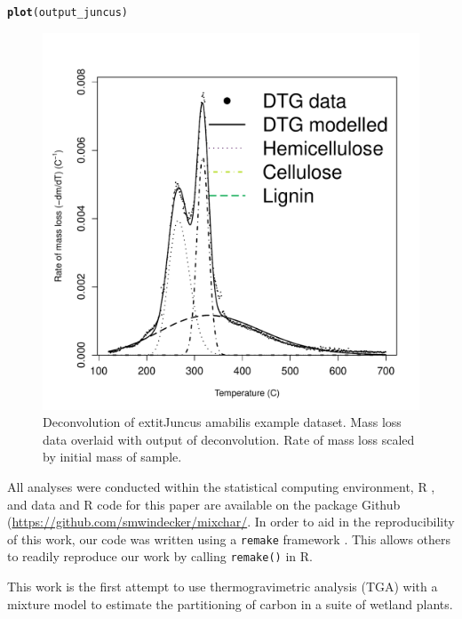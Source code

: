 \documentclass{jors}\usepackage[]{graphicx}\usepackage[]{color}
\makeatletter
\def\maxwidth{ %
  \ifdim\Gin@nat@width>\linewidth
    \linewidth
  \else
    \Gin@nat@width
  \fi
}
\newcommand{\hlstd}[1]{\textcolor[rgb]{0.345,0.345,0.345}{#1}}%
\newcommand{\hlkwd}[1]{\textcolor[rgb]{0.737,0.353,0.396}{\textbf{#1}}}%
\newenvironment{kframe}{%
 \def\at@end@of@kframe{}%
 \ifinner\ifhmode%
  \def\at@end@of@kframe{\end{minipage}}%
  \begin{minipage}{\columnwidth}%
 \fi\fi%
 \def\FrameCommand##1{\hskip\@totalleftmargin \hskip-\fboxsep
 \colorbox{shadecolor}{##1}\hskip-\fboxsep
     \hskip-\linewidth \hskip-\@totalleftmargin \hskip\columnwidth}%
 \MakeFramed {\advance\hsize-\width
   \@totalleftmargin\z@ \linewidth\hsize
   \@setminipage}}%
 {\par\unskip\endMakeFramed%
 \at@end@of@kframe}
\newenvironment{knitrout}{}{} %
\makeatother
\begin{document}
\begin{knitrout}\footnotesize
{}\color{fgcolor}\begin{kframe}
\begin{alltt}
\hlkwd{plot}\hlstd{(output_juncus)}
\end{alltt}
\end{kframe}\begin{figure}[H]
\includegraphics[width=\maxwidth]{figure/unnamed-chunk-14-1} \caption{\label{Fig:decon} Deconvolution of 	extit{Juncus amabilis} example dataset. Mass loss data overlaid with output of deconvolution. Rate of mass loss scaled by initial mass of sample.}\label{fig:unnamed-chunk-14}
\end{figure}


\end{knitrout}

All analyses were conducted within the statistical computing environment, R \citep{R}, and data and R code for this paper are available on the package Github (\url{https://github.com/smwindecker/mixchar/}. In order to aid in the reproducibility of this work, our code was written using a \verb|remake| framework \citep{remake}. This allows others to readily reproduce our work by calling \verb|remake()| in R.


This work is the first attempt to use thermogravimetric analysis (TGA) with a mixture model to estimate the partitioning of carbon in a suite of wetland plants.
\end{document}
